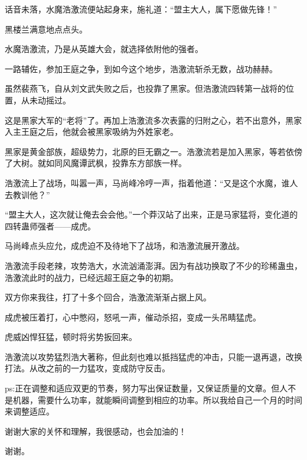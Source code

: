 \begin{this_body}
话音未落，水魔浩激流便站起身来，施礼道：“盟主大人，属下愿做先锋！”

黑楼兰满意地点点头。

水魔浩激流，乃是从英雄大会，就选择依附他的强者。

一路辅佐，参加王庭之争，到如今这个地步，浩激流斩杀无数，战功赫赫。

虽然裴燕飞，自从刘文武失败之后，也投靠了黑家。但浩激流四转第一战将的位置，从未动摇过。

这是黑家大军的“老将”了。再加上浩激流多次表露的归附之心，若不出意外，黑家入主王庭之后，他就会被黑家吸纳为外姓家老。

黑家是黄金部族，超级势力，北原的巨无霸之一。浩激流若是加入黑家，等若依傍了大树。就如同风魔谭武枫，投靠东方部族一样。

浩激流上了战场，叫嚣一声，马尚峰冷哼一声，指着他道：“又是这个水魔，谁人去教训他？”

“盟主大人，这次就让俺去会会他。”一个莽汉站了出来，正是马家猛将，变化道的四转蛊师强者——成虎。

马尚峰点头应允，成虎迫不及待地下了战场，和浩激流展开激战。

浩激流手段老辣，攻势浩大，水流汹涌澎湃。因为有战功换取了不少的珍稀蛊虫，浩激流此时的战力，已经远超王庭之争的初期。

双方你来我往，打了十多个回合，浩激流渐渐占据上风。

成虎被压着打，心中憋闷，怒吼一声，催动杀招，变成一头吊睛猛虎。

虎威凶悍狂猛，顿时将劣势扳回来。

浩激流以攻势猛烈浩大著称，但此刻也难以抵挡猛虎的冲击，只能一退再退，改换打法。从改之前的一力猛攻，变成防守反击。

ps:正在调整和适应双更的节奏，努力写出保证数量，又保证质量的文章。但人不是机器，需要什么功率，就能瞬间调整到相应的功率。所以我给自己一个月的时间来调整适应。

谢谢大家的关怀和理解，我很感动，也会加油的！

谢谢。

\end{this_body}

